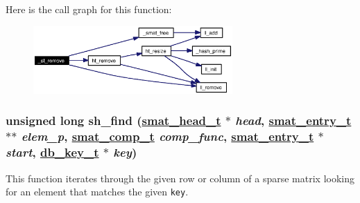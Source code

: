 Here is the call graph for this function:\begin{figure}[H]
\begin{center}
\leavevmode
\includegraphics[width=215pt]{group__dbprim__smat_ga23_cgraph}
\end{center}
\end{figure}
\hypertarget{group__dbprim__smat_ga20}{
\subsubsection[sh\_\-find]{\setlength{\rightskip}{0pt plus 5cm}unsigned long sh\_\-find (\hyperlink{struct__smat__head__s}{smat\_\-head\_\-t} $\ast$ {\em head}, \hyperlink{struct__smat__entry__s}{smat\_\-entry\_\-t} $\ast$$\ast$ {\em elem\_\-p}, \hyperlink{group__dbprim__smat_ga5}{smat\_\-comp\_\-t} {\em comp\_\-func}, \hyperlink{struct__smat__entry__s}{smat\_\-entry\_\-t} $\ast$ {\em start}, \hyperlink{struct__db__key__s}{db\_\-key\_\-t} $\ast$ {\em key})}}
\label{group__dbprim__smat_ga20}


This function iterates through the given row or column of a sparse matrix looking for an element that matches the given {\tt key}.

